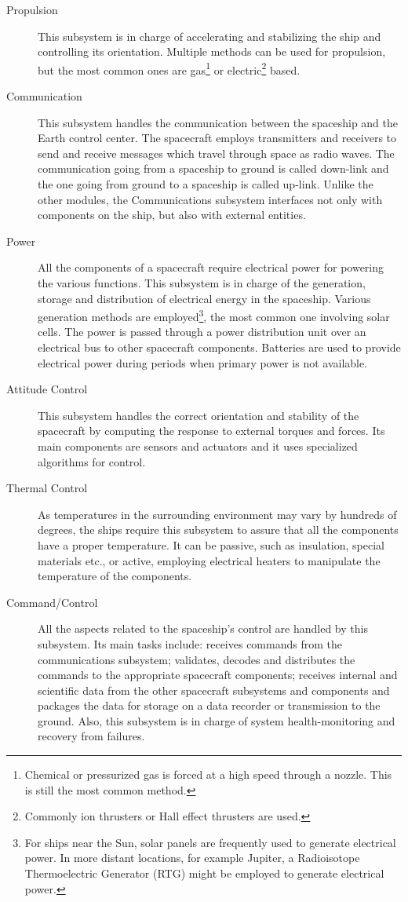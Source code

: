 \begin{description}
  \item[Propulsion] This subsystem is in charge of accelerating and stabilizing
  the ship and controlling its orientation. Multiple methods can be used for
  propulsion, but the most common ones are gas\footnote{Chemical or pressurized
  gas is forced at a high speed through a nozzle. This is still the most common
  method.} or electric\footnote{Commonly ion thrusters or Hall effect thrusters
  are used.} based.
  \item[Communication] This subsystem handles the communication between the
  spaceship and the Earth control center. The spacecraft employs transmitters
  and receivers to send and receive messages which travel through space as radio
  waves. The communication going from a spaceship to ground is called down-link
  and the one going from ground to a spaceship is called up-link. Unlike the
  other modules, the Communications subsystem interfaces not only with
  components on the ship, but also with external entities.
  \item[Power] All the components of a spacecraft require electrical
  power for powering the various functions. This subsystem is in charge of the
  generation, storage and distribution of electrical energy in the spaceship.
  Various generation methods are employed\footnote{For ships near the Sun,
  solar panels are frequently used to generate electrical power. In more distant
  locations, for example Jupiter, a Radioisotope Thermoelectric Generator (RTG)
  might be employed to generate electrical power.}, the most common one
  involving solar cells. The power is passed through a power distribution unit
  over an electrical bus to other spacecraft components. Batteries are used to
  provide electrical power during periods when primary power is not available.
  \item[Attitude Control] This subsystem handles the correct orientation and
  stability of the spacecraft by computing the response to external torques and
  forces. Its main components are sensors and actuators and it uses specialized
  algorithms for control.
  \item[Thermal Control] As temperatures in the surrounding environment may vary
  by hundreds of degrees, the ships require this subsystem to assure that all
  the components have a proper temperature. It can be passive, such as
  insulation, special materials etc., or active, employing electrical heaters
  to manipulate the temperature of the components.
  \item[Command/Control] All the aspects related to the spaceship's control are
  handled by this subsystem. Its main tasks include: receives commands from
  the communications subsystem; validates, decodes and distributes the commands
  to the appropriate spacecraft components; receives internal and scientific
  data from the other spacecraft subsystems and components and packages the data
  for storage on a data recorder or transmission to the ground. Also, this
  subsystem is in charge of system health-monitoring and recovery from failures.
\end{description}

